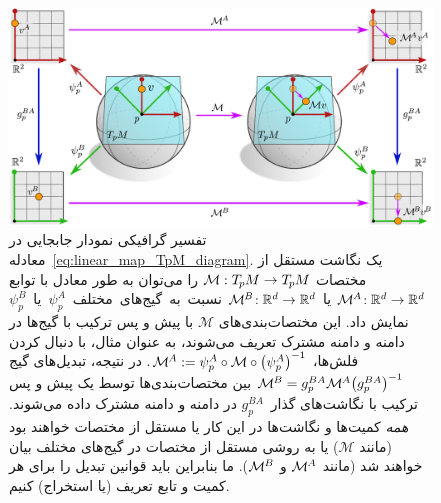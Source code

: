 \begin{figure}
	\centering
	\includegraphics[width=\columnwidth]{figures/gauges_TpM_functions.pdf}
	\vspace*{.5ex}
	\caption{\small
		تفسیر گرافیکی نمودار جابجایی در معادله~\eqref{eq:linear_map_TpM_diagram}.
		یک نگاشت مستقل از مختصات $\mathcal{M}: T_{\mkern-1.5mu p}\mkern-.5muM \to T_{\mkern-1.5mu p}\mkern-.5muM$ را می‌توان به طور معادل با توابع $\mathcal{M}^{\mkern-1mu A}\!: \mathbb{R}^d \to \mathbb{R}^d$ یا $\mathcal{M}^{\mkern-1mu B}\!: \mathbb{R}^d \to \mathbb{R}^d$ \mbox{نسبت به گیج‌های مختلف $\psi_p^A$ یا~$\psi_p^B$} نمایش داد.
		این مختصات‌بندی‌های $\mathcal{M}$ با پیش‌ و پس‌ ترکیب با گیج‌ها در دامنه و دامنه مشترک تعریف می‌شوند، به عنوان مثال، با دنبال کردن فلش‌ها، $\mathcal{M}^{\mkern-1mu A} := \psi_p^A \circ \mathcal{M} \circ \big(\psi_p^A\big)^{-1}$.
		در نتیجه، تبدیل‌های گیج $\mathcal{M}^{\mkern-1mu B} = g_p^{BA} \mathcal{M}^{\mkern-1mu A} \big(g_p^{BA}\big)^{-1}$ بین مختصات‌بندی‌ها توسط یک پیش‌ و پس‌ ترکیب با نگاشت‌های گذار~$g_p^{BA}$ در دامنه و دامنه مشترک داده می‌شوند.
		\emph{همه} کمیت‌ها و نگاشت‌ها در این کار یا مستقل از مختصات خواهند بود (مانند $\mathcal{M}$) یا به روشی مستقل از مختصات در گیج‌های مختلف بیان خواهند شد (مانند $\mathcal{M}^{\mkern-1mu A}$ و $\mathcal{M}^{\mkern-1mu B}$).
		ما بنابراین باید قوانین تبدیل را برای هر کمیت و تابع تعریف (یا استخراج) کنیم.
	}
	\label{fig:gauge_trafos_functions}
\end{figure}

